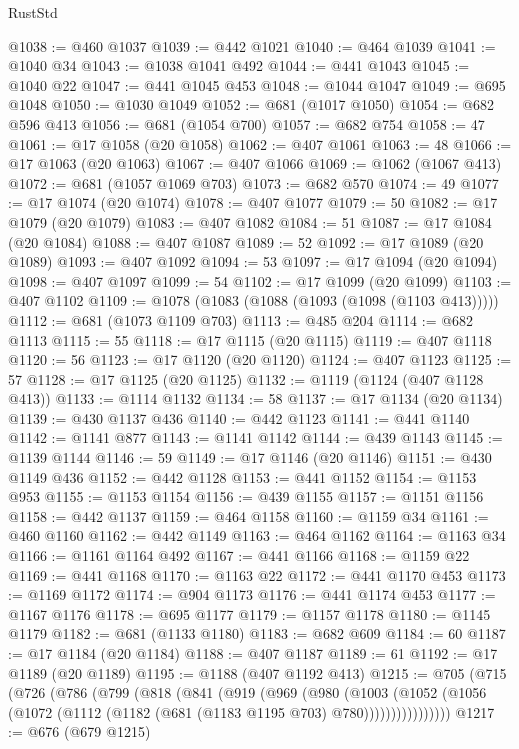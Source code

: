 \begin{lexlean}{RustStd}
\begin{coremodule}
{\begin{coremodule}
{{{{{{{{{{{{{{{{{{{{{{{{{{@1038 := @460 @1037
@1039 := @442 @1021
@1040 := @464 @1039
@1041 := @1040 @34
@1043 := @1038 @1041 @492
@1044 := @441 @1043
@1045 := @1040 @22
@1047 := @441 @1045 @453
@1048 := @1044 @1047
@1049 := @695 @1048
@1050 := @1030 @1049
@1052 := @681 (@1017 @1050)
@1054 := @682 @596 @413
@1056 := @681 (@1054 @700)
@1057 := @682 @754
@1058 := 47
@1061 := @17 @1058 (@20 @1058)
@1062 := @407 @1061
@1063 := 48
@1066 := @17 @1063 (@20 @1063)
@1067 := @407 @1066
@1069 := @1062 (@1067 @413)
@1072 := @681 (@1057 @1069 @703)
@1073 := @682 @570
@1074 := 49
@1077 := @17 @1074 (@20 @1074)
@1078 := @407 @1077
@1079 := 50
@1082 := @17 @1079 (@20 @1079)
@1083 := @407 @1082
@1084 := 51
@1087 := @17 @1084 (@20 @1084)
@1088 := @407 @1087
@1089 := 52
@1092 := @17 @1089 (@20 @1089)
@1093 := @407 @1092
@1094 := 53
@1097 := @17 @1094 (@20 @1094)
@1098 := @407 @1097
@1099 := 54
@1102 := @17 @1099 (@20 @1099)
@1103 := @407 @1102
@1109 := @1078 (@1083 (@1088 (@1093 (@1098 (@1103 @413)))))
@1112 := @681 (@1073 @1109 @703)
@1113 := @485 @204
@1114 := @682 @1113
@1115 := 55
@1118 := @17 @1115 (@20 @1115)
@1119 := @407 @1118
@1120 := 56
@1123 := @17 @1120 (@20 @1120)
@1124 := @407 @1123
@1125 := 57
@1128 := @17 @1125 (@20 @1125)
@1132 := @1119 (@1124 (@407 @1128 @413))
@1133 := @1114 @1132
@1134 := 58
@1137 := @17 @1134 (@20 @1134)
@1139 := @430 @1137 @436
@1140 := @442 @1123
@1141 := @441 @1140
@1142 := @1141 @877
@1143 := @1141 @1142
@1144 := @439 @1143
@1145 := @1139 @1144
@1146 := 59
@1149 := @17 @1146 (@20 @1146)
@1151 := @430 @1149 @436
@1152 := @442 @1128
@1153 := @441 @1152
@1154 := @1153 @953
@1155 := @1153 @1154
@1156 := @439 @1155
@1157 := @1151 @1156
@1158 := @442 @1137
@1159 := @464 @1158
@1160 := @1159 @34
@1161 := @460 @1160
@1162 := @442 @1149
@1163 := @464 @1162
@1164 := @1163 @34
@1166 := @1161 @1164 @492
@1167 := @441 @1166
@1168 := @1159 @22
@1169 := @441 @1168
@1170 := @1163 @22
@1172 := @441 @1170 @453
@1173 := @1169 @1172
@1174 := @904 @1173
@1176 := @441 @1174 @453
@1177 := @1167 @1176
@1178 := @695 @1177
@1179 := @1157 @1178
@1180 := @1145 @1179
@1182 := @681 (@1133 @1180)
@1183 := @682 @609
@1184 := 60
@1187 := @17 @1184 (@20 @1184)
@1188 := @407 @1187
@1189 := 61
@1192 := @17 @1189 (@20 @1189)
@1195 := @1188 (@407 @1192 @413)
@1215 := @705
    (@715
      (@726
        (@786
          (@799
            (@818
              (@841
                (@919
                  (@969
                    (@980
                      (@1003
                        (@1052
                          (@1056 (@1072 (@1112 (@1182 (@681 (@1183 @1195 @703) @780))))))))))))))))
@1217 := @676 (@679 @1215)
}}}}}}}}}}}}}}}}}}}}}}}}}}
\end{coremodule}}
\end{coremodule}
\end{lexlean}
